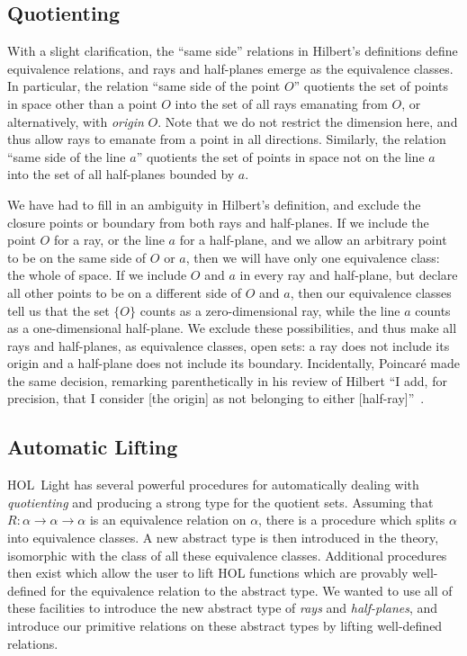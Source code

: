 \subsection{Quotienting}\label{sec:RayQuotienting}
With a slight clarification, the ``same side'' relations in Hilbert's definitions define equivalence relations, and rays and half-planes emerge as the equivalence classes. In particular, the relation ``same side of the point $O$'' quotients the set of points in space other than a point $O$ into the set of all rays emanating from $O$, or alternatively, with \emph{origin} $O$. Note that we do not restrict the dimension here, and thus allow rays to emanate from a point in all directions. Similarly, the relation ``same side of the line $a$'' quotients the set of points in space not on the line $a$ into the set of all half-planes bounded by $a$. 

We have had to fill in an ambiguity in Hilbert's definition, and exclude the closure points or boundary from both rays and half-planes. If we include the point $O$ for a ray, or the line $a$ for a half-plane, and we allow an arbitrary point to be on the same side of $O$ or $a$, then we will have only one equivalence class: the whole of space. If we include $O$ and $a$ in every ray and half-plane, but declare all other points to be on a different side of $O$ and $a$, then our equivalence classes tell us that the set $\{O\}$ counts as a zero-dimensional ray, while the line $a$ counts as a one-dimensional half-plane. We exclude these possibilities, and thus make all rays and half-planes, as equivalence classes, open sets: a ray does not include its origin and a half-plane does not include its boundary. Incidentally, Poincar\'{e} made the same decision, remarking parenthetically in his review of Hilbert ``I add, for precision, that I consider [the origin] as not belonging to either [half-ray]''~\cite{PoincareReview}.

\subsection{Automatic Lifting}
HOL~Light has several powerful procedures for automatically dealing with \emph{quotienting} and producing a strong type for the quotient sets. Assuming that $R:\alpha\rightarrow \alpha \rightarrow \alpha$ is an equivalence relation on $\alpha$, there is a procedure which splits $\alpha$ into equivalence classes. A new abstract type is then introduced in the theory, isomorphic with the class of all these equivalence classes. Additional procedures then exist which allow the user to lift HOL functions which are provably well-defined for the equivalence relation to the abstract type. We wanted to use all of these facilities to introduce the new abstract type of \emph{rays} and \emph{half-planes}, and introduce our primitive relations on these abstract types by lifting well-defined relations. 

